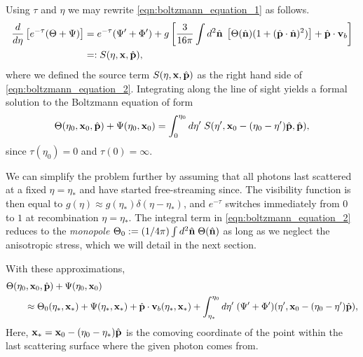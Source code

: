 Using $\tau$ and $\eta$ we may rewrite \eqref{eqn:boltzmann_equation_1} as follows.
\begin{align}
	\frac{d}{d\eta} \left[ e^{-\tau} (\Theta + \Psi) \right] &= e^{-\tau}(\Psi' + \Phi') + g \left[ \frac{3}{16\pi} \int d^2\hat{\mathbf{n}} \; \left[ \Theta(\hat{\mathbf{n}}) (1 + (\hat{\mathbf{p}} \cdot \hat{\mathbf{n}})^2) \right] + \hat{\mathbf{p}} \cdot \mathbf{v}_b \right] \label{eqn:boltzmann_equation_2} \\
	&=: S(\eta, \mathbf{x}, \hat{\mathbf{p}}), \label{def:boltzmann_source_term}
\end{align}
where we defined the source term $S(\eta,\mathbf{x},\hat{\mathbf{p}})$ as the right hand side of \eqref{eqn:boltzmann_equation_2}. Integrating along the line of sight yields a formal solution to the Boltzmann equation of form
\begin{align}
	\Theta(\eta_0, \mathbf{x}_0, \hat{\mathbf{p}}) + \Psi(\eta_0, \mathbf{x}_0) = \int_0^{\eta_0} d\eta' \; S(\eta', \mathbf{x}_0 - (\eta_0 -\eta') \hat{\mathbf{p}}, \hat{\mathbf{p}}), 
\end{align}
since $\tau(\eta_0)=0$ and $\tau(0) = \infty$.

We can simplify the problem further by assuming that all photons last scattered at a fixed $\eta=\eta_*$ and have started free-streaming since. The visibility function is then equal to $g(\eta)\approx g(\eta_*)\delta(\eta-\eta_*)$, and $e^{-\tau}$ switches immediately from $0$ to $1$ at recombination $\eta=\eta_*$. The integral term in \eqref{eqn:boltzmann_equation_2} reduces to the \textit{monopole} $\Theta_0 := (1/4\pi)\int d^2\hat{\mathbf{n}} \;\Theta(\hat{\mathbf{n}})$ as long as we neglect the anisotropic stress, which we will detail in the next section. 

With these approximations,
\begin{align}
	&\Theta(\eta_0, \mathbf{x}_0, \hat{\mathbf{p}}) + \Psi(\eta_0, \mathbf{x}_0) \nonumber \\
	&\qquad \approx \Theta_0(\eta_*, \mathbf{x}_*) + \Psi(\eta_*, \mathbf{x}_*) + \hat{\mathbf{p}}\cdot \mathbf{v}_b (\eta_*, \mathbf{x}_*) + \int_{\eta_*}^{\eta_0} d\eta' \; (\Psi' + \Phi')(\eta', \mathbf{x}_0-(\eta_0-\eta')\hat{\mathbf{p}}), \label{eqn:line_of_sight_solution_approximated}
\end{align}
Here, $\mathbf{x}_* = \mathbf{x}_0-(\eta_0-\eta_*)\hat{\mathbf{p}}$ is the comoving coordinate of the point within the last scattering surface where the given photon comes from.

